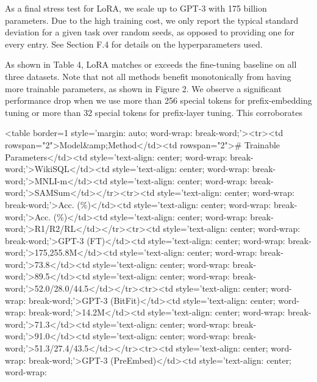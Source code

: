 \documentclass[conference]{IEEEtran}
\begin{document}
As a final stress test for LoRA, we scale up to GPT-3 with 175 billion parameters. Due to the high training cost, we only report the typical standard deviation for a given task over random seeds, as opposed to providing one for every entry. See Section F.4 for details on the hyperparameters used.

As shown in Table 4, LoRA matches or exceeds the fine-tuning baseline on all three datasets. Note that not all methods benefit monotonically from having more trainable parameters, as shown in Figure 2. We observe a significant performance drop when we use more than 256 special tokens for prefix-embedding tuning or more than 32 special tokens for prefix-layer tuning. This corroborates

\textless{}table border=1 style='margin: auto; word-wrap: break-word;'\textgreater{}\textless{}tr\textgreater{}\textless{}td rowspan="2"\textgreater{}Model\&amp;Method\textless{}/td\textgreater{}\textless{}td rowspan="2"\textgreater{}\# Trainable Parameters\textless{}/td\textgreater{}\textless{}td style='text-align: center; word-wrap: break-word;'\textgreater{}WikiSQL\textless{}/td\textgreater{}\textless{}td style='text-align: center; word-wrap: break-word;'\textgreater{}MNLI-m\textless{}/td\textgreater{}\textless{}td style='text-align: center; word-wrap: break-word;'\textgreater{}SAMSum\textless{}/td\textgreater{}\textless{}/tr\textgreater{}\textless{}tr\textgreater{}\textless{}td style='text-align: center; word-wrap: break-word;'\textgreater{}Acc. (\%)\textless{}/td\textgreater{}\textless{}td style='text-align: center; word-wrap: break-word;'\textgreater{}Acc. (\%)\textless{}/td\textgreater{}\textless{}td style='text-align: center; word-wrap: break-word;'\textgreater{}R1/R2/RL\textless{}/td\textgreater{}\textless{}/tr\textgreater{}\textless{}tr\textgreater{}\textless{}td style='text-align: center; word-wrap: break-word;'\textgreater{}GPT-3 (FT)\textless{}/td\textgreater{}\textless{}td style='text-align: center; word-wrap: break-word;'\textgreater{}175,255.8M\textless{}/td\textgreater{}\textless{}td style='text-align: center; word-wrap: break-word;'\textgreater{}73.8\textless{}/td\textgreater{}\textless{}td style='text-align: center; word-wrap: break-word;'\textgreater{}89.5\textless{}/td\textgreater{}\textless{}td style='text-align: center; word-wrap: break-word;'\textgreater{}52.0/28.0/44.5\textless{}/td\textgreater{}\textless{}/tr\textgreater{}\textless{}tr\textgreater{}\textless{}td style='text-align: center; word-wrap: break-word;'\textgreater{}GPT-3 (BitFit)\textless{}/td\textgreater{}\textless{}td style='text-align: center; word-wrap: break-word;'\textgreater{}14.2M\textless{}/td\textgreater{}\textless{}td style='text-align: center; word-wrap: break-word;'\textgreater{}71.3\textless{}/td\textgreater{}\textless{}td style='text-align: center; word-wrap: break-word;'\textgreater{}91.0\textless{}/td\textgreater{}\textless{}td style='text-align: center; word-wrap: break-word;'\textgreater{}51.3/27.4/43.5\textless{}/td\textgreater{}\textless{}/tr\textgreater{}\textless{}tr\textgreater{}\textless{}td style='text-align: center; word-wrap: break-word;'\textgreater{}GPT-3 (PreEmbed)\textless{}/td\textgreater{}\textless{}td style='text-align: center; word-wrap: 
\end{document}

